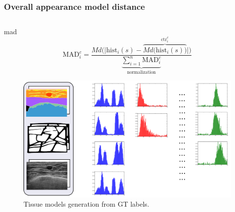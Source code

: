 \begin{frame}\frametitle{Overall appearance model distance}\scriptsize
\vspace{-10pt}
\begin{columns}
\begin{column}{.49\textwidth}
\begin{block}{\acf{mad}}
\vspace{-10pt}
\begin{equation*}
\text{MAD}^c_i = \frac{Md \Big ( \Big |\text{hist}_i(s) -  \overbrace{Md \big (\text{hist}_i(s) \big )}^{\text{ctr}^c_i} \Big | 
 \Big)} {\underbrace{\sum\nolimits_{i=1}^n \text{MAD}^c_i}_{\text{normalization}}}
\end{equation*}
\end{block}
\vspace{-10pt}
\begin{figure}[htbp]
\centering
\includegraphics[width=.9\textwidth]{madModels.pdf}
\caption{{\tiny Tissue models generation from GT labels.}}
\end{figure}


\end{column}
\end{columns}
\end{frame}
